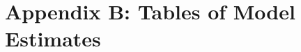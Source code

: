 \documentclass[12pt]{article}
\begin{document}
\clearpage
\section*{Appendix B: Tables of Model Estimates}
\renewcommand\thefigure{B.\arabic{figure}}
\renewcommand\thetable{B.\arabic{table}}
\setcounter{figure}{0}
\setcounter{table}{0}







\end{document}
